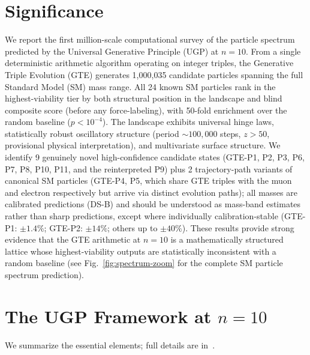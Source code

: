 \documentclass[12pt]{article}
\numberwithin{equation}{section}
\begin{document}
\section*{Significance}

We report the first million-scale computational survey of the particle spectrum predicted by the Universal Generative Principle (UGP) at $n{=}10$. From a single deterministic arithmetic algorithm operating on integer triples, the Generative Triple Evolution (GTE) generates 1,000,035 candidate particles spanning the full Standard Model (SM) mass range. All 24 known SM particles rank in the highest-viability tier by both structural position in the landscape and blind composite score (before any force-labeling), with 50-fold enrichment over the random baseline ($p < 10^{-4}$). The landscape exhibits universal hinge laws, statistically robust oscillatory structure (period ${\sim}100{,}000$ steps, $z > 50$, provisional physical interpretation), and multivariate surface structure. We identify 9 genuinely novel high-confidence candidate states (GTE-P1, P2, P3, P6, P7, P8, P10, P11, and the reinterpreted P9) plus 2 trajectory-path variants of canonical SM particles (GTE-P4, P5, which share GTE triples with the muon and electron respectively but arrive via distinct evolution paths); all masses are calibrated predictions (DS-B) and should be understood as mass-band estimates rather than sharp predictions, except where individually calibration-stable (GTE-P1: $\pm 1.4\%$; GTE-P2: $\pm 14\%$; others up to $\pm 40\%$). These results provide strong evidence that the GTE arithmetic at $n{=}10$ is a mathematically structured lattice whose highest-viability outputs are statistically inconsistent with a random baseline (see Fig.~\ref{fig:spectrum-zoom} for the complete SM particle spectrum prediction).

\section{The UGP Framework at $n{=}10$}
\label{sec:framework}

We summarize the essential elements; full details are in~\cite{SpivackUGPFormalization,SpivackSM}.
\end{document}
